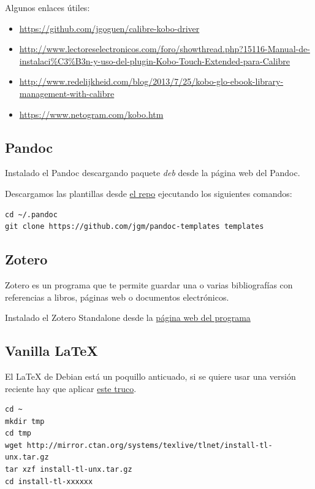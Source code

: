 \documentclass[12pt,spanish,]{article}
\providecommand{\tightlist}{%
  \setlength{\itemsep}{0pt}\setlength{\parskip}{0pt}}
\begin{document}
Algunos enlaces útiles:

\begin{itemize}
\tightlist
\item
  \url{https://github.com/jgoguen/calibre-kobo-driver}
\item
  \url{http://www.lectoreselectronicos.com/foro/showthread.php?15116-Manual-de-instalaci\%C3\%B3n-y-uso-del-plugin-Kobo-Touch-Extended-para-Calibre}
\item
  \url{http://www.redelijkheid.com/blog/2013/7/25/kobo-glo-ebook-library-management-with-calibre}
\item
  \url{https://www.netogram.com/kobo.htm}
\end{itemize}

\subsection{Pandoc}\label{pandoc}

Instalado el Pandoc descargando paquete \emph{deb} desde la página web
del Pandoc.

Descargamos las plantillas desde
\href{https://github.com/jgm/pandoc-templates}{el repo} ejecutando los
siguientes comandos:

\begin{verbatim}
cd ~/.pandoc
git clone https://github.com/jgm/pandoc-templates templates
\end{verbatim}

\subsection{Zotero}\label{zotero}

Zotero es un programa que te permite guardar una o varias bibliografías
con referencias a libros, páginas web o documentos electrónicos.

Instalado el Zotero Standalone desde la
\href{https://www.zotero.org/}{página web del programa}

\subsection{Vanilla LaTeX}\label{vanilla-latex}

El LaTeX de Debian está un poquillo anticuado, si se quiere usar una
versión reciente hay que aplicar
\href{http://tex.stackexchange.com/questions/1092/how-to-install-vanilla-texlive-on-debian-or-ubuntu}{este
truco}.

\begin{verbatim}
cd ~
mkdir tmp
cd tmp
wget http://mirror.ctan.org/systems/texlive/tlnet/install-tl-unx.tar.gz
tar xzf install-tl-unx.tar.gz
cd install-tl-xxxxxx
\end{verbatim}
\end{document}
